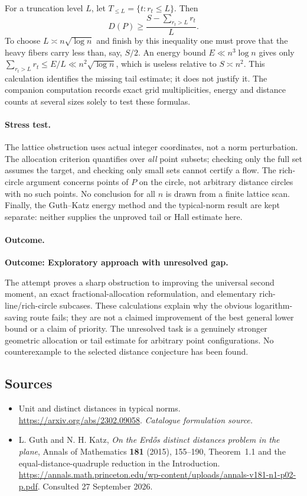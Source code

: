 \documentclass[11pt,a4paper]{article}
\numberwithin{equation}{section}
\begin{document}
For a truncation level $L$, let $T_{\le L}=\{t:r_t\le L\}$. Then
\[
 D(P)\ge \frac{S-\sum_{r_t>L}r_t}{L}.
\]
To choose $L\asymp n\sqrt{\log n}$ and finish by this inequality one
must prove that the heavy fibers carry less than, say, $S/2$.
An energy bound $E\ll n^3\log n$ gives only
$\sum_{r_t>L}r_t\le E/L\ll n^2\sqrt{\log n}$, which is useless relative
to $S\asymp n^2$. This calculation identifies the missing tail estimate;
it does not justify it. The companion computation records exact grid
multiplicities, energy and distance counts at several sizes solely to
test these formulas.

\paragraph{Stress test.}
The lattice obstruction uses actual integer coordinates, not a norm
perturbation. The allocation criterion quantifies over \emph{all} point
subsets; checking only the full set assumes the target, and checking only
small sets cannot certify a flow. The rich-circle argument concerns
points of $P$ on the circle, not arbitrary distance circles with no such
points. No conclusion for all $n$ is drawn from a finite lattice scan.
Finally, the Guth--Katz energy method and the typical-norm result are
kept separate: neither supplies the unproved tail or Hall estimate here.

\paragraph{Outcome.}
\textbf{Outcome: Exploratory approach with unresolved gap.}

The attempt proves a sharp obstruction to improving the universal second
moment, an exact fractional-allocation reformulation, and elementary
rich-line/rich-circle subcases. These calculations explain why the
obvious logarithm-saving route fails; they are not a claimed improvement
of the best general lower bound or a claim of priority.
The unresolved task is a genuinely stronger geometric allocation or
tail estimate for arbitrary point configurations. No counterexample to
the selected distance conjecture has been found.
\subsection{Sources}
\begin{itemize}\raggedright
\item[\textnormal{[S1]}]\hypertarget{source:30006795:1}{} Unit and distinct distances in typical norms.
\url{https://arxiv.org/abs/2302.09058}.
{\small\textit{Catalogue formulation source.}}
\item[\textnormal{[E1]}]\hypertarget{extra:30006795:1}{}
L. Guth and N. H. Katz, \emph{On the Erd\H{o}s distinct distances problem
in the plane}, Annals of Mathematics \textbf{181} (2015), 155--190,
Theorem~1.1 and the equal-distance-quadruple reduction in the Introduction.
\url{https://annals.math.princeton.edu/wp-content/uploads/annals-v181-n1-p02-p.pdf}.
Consulted 27 September 2026.
\end{itemize}
\end{document}
